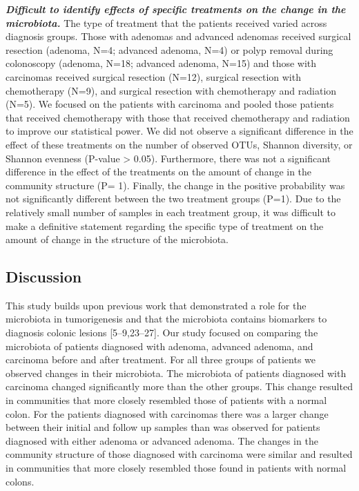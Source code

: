 \documentclass[12pt,]{article}
\begin{document}
\textbf{\emph{Difficult to identify effects of specific treatments on
the change in the microbiota.}} The type of treatment that the patients
received varied across diagnosis groups. Those with adenomas and
advanced adenomas received surgical resection (adenoma, N=4; advanced
adenoma, N=4) or polyp removal during colonoscopy (adenoma, N=18;
advanced adenoma, N=15) and those with carcinomas received surgical
resection (N=12), surgical resection with chemotherapy (N=9), and
surgical resection with chemotherapy and radiation (N=5). We focused on
the patients with carcinoma and pooled those patients that received
chemotherapy with those that received chemotherapy and radiation to
improve our statistical power. We did not observe a significant
difference in the effect of these treatments on the number of observed
OTUs, Shannon diversity, or Shannon evenness (P-value \textgreater{}
0.05). Furthermore, there was not a significant difference in the effect
of the treatments on the amount of change in the community structure (P=
1). Finally, the change in the positive probability was not
significantly different between the two treatment groups (P=1). Due to
the relatively small number of samples in each treatment group, it was
difficult to make a definitive statement regarding the specific type of
treatment on the amount of change in the structure of the microbiota.

\newpage

\subsection{Discussion}\label{discussion}

This study builds upon previous work that demonstrated a role for the
microbiota in tumorigenesis and that the microbiota contains biomarkers
to diagnosis colonic lesions {[}5--9,23--27{]}. Our study focused on
comparing the microbiota of patients diagnosed with adenoma, advanced
adenoma, and carcinoma before and after treatment. For all three groups
of patients we observed changes in their microbiota. The microbiota of
patients diagnosed with carcinoma changed significantly more than the
other groups. This change resulted in communities that more closely
resembled those of patients with a normal colon. For the patients
diagnosed with carcinomas there was a larger change between their
initial and follow up samples than was observed for patients diagnosed
with either adenoma or advanced adenoma. The changes in the community
structure of those diagnosed with carcinoma were similar and resulted in
communities that more closely resembled those found in patients with
normal colons.
\end{document}
